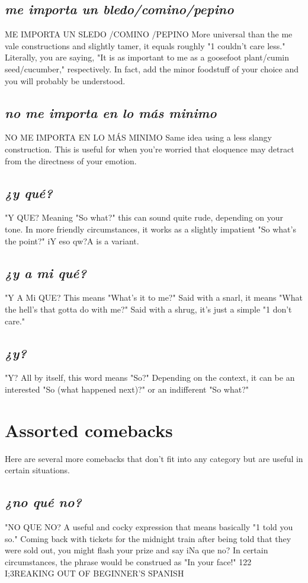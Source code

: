 \subsection{\emph{me importa un bledo/comino/pepino}}
ME IMPORTA UN SLEDO /COMINO /PEPINO
More universal than the me vale constructions and slightly
tamer, it equals roughly "1 couldn't care less." Literally, you are saying,
"It is as important to me as a goosefoot plant/cumin seed/cucumber,"
respectively. In fact, add the minor foodstuff of your choice and you
will probably be understood.
\subsection{\emph{no me importa en lo más  minimo}}
NO ME IMPORTA EN LO MÁS MINIMO
Same idea using a less slangy construction. This is useful for
when you're worried that eloquence may detract from the directness of
your emotion.
\subsection{\emph{¿y qué?}}
"Y QUE?
Meaning "So what?" this can sound quite rude, depending on
your tone. In more friendly circumstances, it works as a slightly impatient "So what's the point?" iY eso qw?A is a variant.
\subsection{\emph{¿y a mi qué?}}
"Y A Mi QUE?
This means "What's it to me?" Said with a snarl, it means
"What the hell's that gotta do with me?" Said with a shrug, it's just a
simple "1 don't care."
\subsection{\emph{¿y?}}
"Y?
All by itself, this word means "So?" Depending on the context,
it can be an interested "So (what happened next)?" or an indifferent
"So what?"
\section{Assorted comebacks}
Here are several more comebacks that don't fit into any category but are useful in certain situations.
\subsection{\emph{¿no qué no?}}
"NO QUE NO?
A useful and cocky expression that means basically "1 told you
so." Coming back with tickets for the midnight train after being told
that they were sold out, you might flash your prize and say iNa que
no? In certain circumstances, the phrase would be construed as "In
your face!"
122 I;3REAKING OUT OF BEGINNER'S SPANISH
